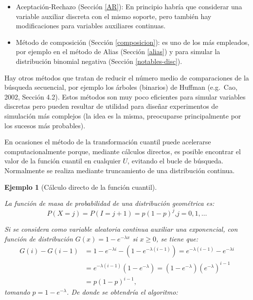 \documentclass[
]{book}
\theoremstyle{break}
\newtheorem{example}{Ejemplo}[chapter]
\theoremstyle{nonumberplain}
\begin{document}
\begin{itemize}
\item
  Aceptación-Rechazo (Sección \ref{AR}): En principio habría que considerar una variable auxiliar discreta con el mismo soporte, pero también hay modificaciones para variables auxiliares continuas.
\item
  Método de composición (Sección \ref{composicion}): es uno de los más empleados, por ejemplo en el método de Alias (Sección \ref{alias}) y para simular la distribución binomial negativa (Sección \ref{notables-disc}).
\end{itemize}

Hay otros métodos que tratan de reducir el número medio de comparaciones de la búsqueda secuencial, por ejemplo los árboles (binarios) de Huffman (e.g.~Cao, 2002, Sección 4.2).
Estos métodos son muy poco eficientes para simular variables discretas pero pueden resultar de utilidad para diseñar experimentos de simulación más complejos (la idea es la misma, preocuparse principalmente por los sucesos más probables).

En ocasiones el método de la transformación cuantil puede acelerarse computacionalmente porque, mediante cálculos directos, es posible encontrar el valor de la función cuantil en cualquier \(U\), evitando el bucle de búsqueda.
Normalmente se realiza mediante truncamiento de una distribución continua.

\begin{example}[Cálculo directo de la función cuantil]
\protect\hypertarget{exm:transcuant-directo}{}\label{exm:transcuant-directo}

La función de masa de probabilidad de una distribución geométrica es:
\[P\left( X=j\right)  =P\left( I=j+1\right)  =p\left( 1-p\right)^{j}\text{,
}j=0,1,\ldots\]

Si se considera como variable aleatoria continua auxiliar una exponencial, con función de distribución
\(G\left( x\right) = 1-e^{-\lambda x}\) si \(x\geq0\),
se tiene que:
\[\begin{aligned}
G\left( i\right) - G\left( i-1\right)   
& = 1-e^{-\lambda i}-\left(1-e^{-\lambda\left( i-1\right) }\right)  
= e^{-\lambda\left( i-1\right)}-e^{-\lambda i}\\
& = e^{-\lambda\left( i-1\right)  }\left( 1-e^{-\lambda}\right)  
= \left( 1-e^{-\lambda}\right)  \left( e^{-\lambda}\right)^{i-1} \\
& = p\left(1-p\right)^{i-1},
\end{aligned}\]
tomando \(p=1-e^{-\lambda}\).
De donde se obtendría el algoritmo:
\end{example}
\end{document}
